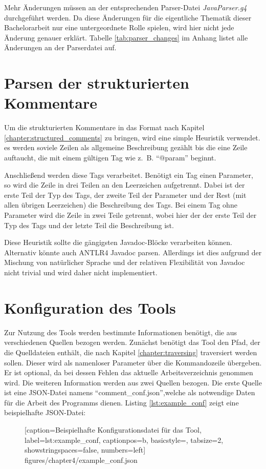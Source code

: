 Mehr Änderungen müssen an der entsprechenden Parser-Datei \textit{JavaParser.g4} durchgeführt werden.  Da diese Änderungen für die eigentliche Thematik dieser Bachelorarbeit nur eine untergeordnete Rolle spielen, wird hier nicht jede Änderung genauer erklärt. Tabelle \ref{tab:parser_changes} im Anhang listet alle Änderungen an der Parserdatei auf. 
\section{Parsen der strukturierten Kommentare}
Um die strukturierten Kommentare in das Format nach Kapitel \ref{chapter:structured_comments} zu bringen, wird eine simple Heuristik verwendet. es werden soviele Zeilen als allgemeine Beschreibung gezählt bis die eine Zeile auftaucht, die mit einem gültigen Tag wie z.~B. \enquote{@param} beginnt.

Anschließend werden diese Tags verarbeitet. Benötigt ein Tag einen Parameter, so wird die Zeile in drei Teilen an den Leerzeichen aufgetrennt. Dabei ist der erste Teil der Typ des Tags, der zweite Teil der Parameter und der Rest (mit allen übrigen Leerzeichen) die Beschreibung des Tags.
Bei einem Tag ohne Parameter wird die Zeile in zwei Teile getrennt, wobei hier der der erste Teil der Typ des Tags und der letzte Teil die Beschreibung ist.

Diese Heuristik sollte die gängigsten Javadoc-Blöcke verarbeiten können. Alternativ könnte auch ANTLR4 Javadoc parsen. Allerdings ist dies aufgrund der Mischung von natürlicher Sprache und der relativen Flexibilität von Javadoc nicht trivial und wird daher nicht implementiert. 
\section{Konfiguration des Tools}\label{chapter:conf}
Zur Nutzung des Tools werden bestimmte Informationen benötigt, die aus verschiedenen Quellen bezogen werden. Zunächst benötigt das Tool den Pfad, der die Quelldateien enthält, die nach Kapitel \ref{chapter:traversing} traversiert werden sollen. Dieser wird als namenloser Parameter über die Kommandozeile übergeben. Er ist optional, da bei dessen Fehlen das aktuelle Arbeitsverzeichnis genommen wird. Die weiteren Information werden aus zwei Quellen bezogen. Die erste Quelle ist eine \ac{JSON}-Datei namens \enquote{comment\_conf.json},welche als notwendige Daten für die Arbeit des Programms dienen. Listing \ref{lst:example_conf} zeigt eine beispielhafte \ac{JSON}-Datei:

\begin{figure} [htbp]

[caption={Beispielhafte Konfigurationsdatei für das Tool},
label={lst:example_conf},
captionpos=b, basicstyle=\footnotesize, tabsize=2, showstringspaces=false,  numbers=left]
{figures/chapter4/example_conf.json}
\end{figure}

